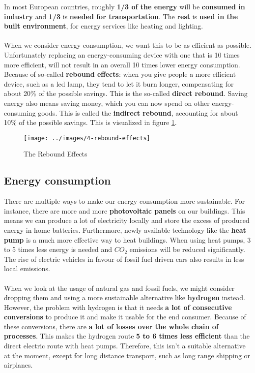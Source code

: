 \documentclass[../summary.tex]{subfiles}
\begin{document}
	In most European countries, roughly \textbf{1/3 of the energy} will be \textbf{consumed in industry} and \textbf{1/3} is \textbf{needed for transportation}. The \textbf{rest} is \textbf{used in the built environment}, for energy services like heating and lighting. 
	\\\\
	When we consider energy consumption, we want this to be as efficient as possible. Unfortunately replacing an energy-consuming device with one that is 10 times more efficient, will not result in an overall 10 times lower energy consumption. Because of so-called \textbf{rebound effects}: when you give people a more efficient device, such as a led lamp, they tend to let it burn longer, compensating for about 20\% of the possible savings. This is the so-called \textbf{direct rebound}. Saving energy also means saving money, which you can now spend on other energy-consuming goods. This is called the \textbf{indirect rebound}, accounting for about 10\% of the possible savings. This is visualized in figure \ref{fig:rebound-effects}.
	
	\begin{figure}[H]
	\centering
	\texttt{[image: ../images/4-rebound-effects]}
	\caption{The Rebound Effects}
	\label{fig:rebound-effects}
\end{figure}
	
	\subsection{Energy consumption}
	
	There are multiple ways to make our energy consumption more sustainable. For instance, there are more and more \textbf{photovoltaic panels} on our buildings. This means we can produce a lot of electricity locally and store the excess of produced energy in home batteries. Furthermore, newly available technology like the \textbf{heat pump} is a much more effective way to heat buildings. When using heat pumps, 3 to 5 times less energy is needed and $CO_2$ emissions will be reduced significantly. The rise of electric vehicles in favour of fossil fuel driven cars also results in less local emissions.
	\\\\
	When we look at the usage of natural gas and fossil fuels, we might consider dropping them and using a more sustainable alternative like \textbf{hydrogen} instead. However, the problem with hydrogen is that it needs \textbf{a lot of consecutive conversions} to produce it and make it usable for the end consumer. Because of these conversions, there are \textbf{a lot of losses over the whole chain of processes}. This makes the hydrogen route \textbf{5 to 6 times less efficient} than the direct electric route with heat pumps. Therefore, this isn't a suitable alternative at the moment, except for long distance transport, such as long range shipping or airplanes.
	
\end{document}
